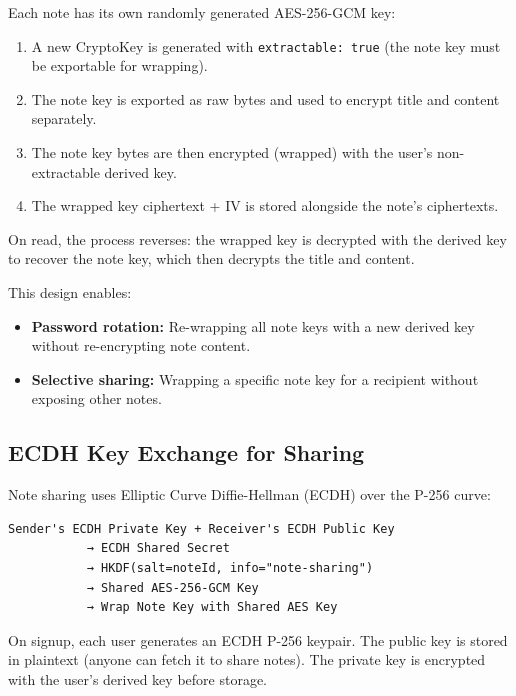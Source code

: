 Each note has its own randomly generated AES-256-GCM key:
\begin{enumerate}
    \item A new CryptoKey is generated with \texttt{extractable: true} (the note key must be exportable for wrapping).
    \item The note key is exported as raw bytes and used to encrypt title and content separately.
    \item The note key bytes are then encrypted (wrapped) with the user's non-extractable derived key.
    \item The wrapped key ciphertext + IV is stored alongside the note's ciphertexts.
\end{enumerate}

On read, the process reverses: the wrapped key is decrypted with the derived key to recover the note key, which then decrypts the title and content.

This design enables:
\begin{itemize}
    \item \textbf{Password rotation:} Re-wrapping all note keys with a new derived key without re-encrypting note content.
    \item \textbf{Selective sharing:} Wrapping a specific note key for a recipient without exposing other notes.
\end{itemize}

\subsection{ECDH Key Exchange for Sharing}

Note sharing uses Elliptic Curve Diffie-Hellman (ECDH) over the P-256 curve:

\begin{verbatim}
Sender's ECDH Private Key + Receiver's ECDH Public Key
           → ECDH Shared Secret
           → HKDF(salt=noteId, info="note-sharing")
           → Shared AES-256-GCM Key
           → Wrap Note Key with Shared AES Key
\end{verbatim}

On signup, each user generates an ECDH P-256 keypair. The public key is stored in plaintext (anyone can fetch it to share notes). The private key is encrypted with the user's derived key before storage.

